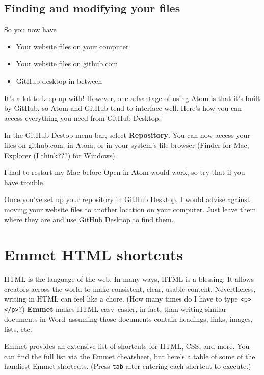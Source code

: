 \documentclass[]{book}
\providecommand{\tightlist}{%
  \setlength{\itemsep}{0pt}\setlength{\parskip}{0pt}}
\theoremstyle{definition}
\theoremstyle{definition}
\theoremstyle{definition}
\theoremstyle{remark}
\begin{document}
\hypertarget{finding-and-modifying-your-files}{%
\subsection{Finding and modifying your
files}\label{finding-and-modifying-your-files}}

So you now have

\begin{itemize}
\tightlist
\item
  Your website files on your computer
\item
  Your website files on github.com
\item
  GitHub desktop in between
\end{itemize}

It's a lot to keep up with! However, one advantage of using Atom is that
it's built by GitHub, so Atom and GitHub tend to interface well. Here's
how you can access everything you need from GitHub Desktop:

In the GitHub Destop menu bar, select \textbf{Repository}. You can now
access your files on github.com, in Atom, or in your system's file
browser (Finder for Mac, Explorer (I think???) for Windows).

I had to restart my Mac before Open in Atom would work, so try that if
you have trouble.

Once you've set up your repository in GitHub Desktop, I would advise
against moving your website files to another location on your computer.
Just leave them where they are and use GitHub Desktop to find them.

\hypertarget{emmet}{%
\section{Emmet HTML shortcuts}\label{emmet}}

HTML is the language of the web. In many ways, HTML is a blessing: It
allows creators across the world to make consistent, clear, usable
content. Nevertheless, writing in HTML can feel like a chore. (How many
times do I have to type
\texttt{\textless{}p\textgreater{}\textless{}/p\textgreater{}}?)
\textbf{Emmet} makes HTML easy--easier, in fact, than writing similar
documents in Word--assuming those documents contain headings, links,
images, lists, etc.

Emmet provides an extensive list of shortcuts for HTML, CSS, and more.
You can find the full list via the
\href{https://docs.emmet.io/cheat-sheet/}{Emmet cheatsheet}, but here's
a table of some of the handiest Emmet shortcuts. (Press \texttt{tab}
after entering each shortcut to execute.)
\end{document}
